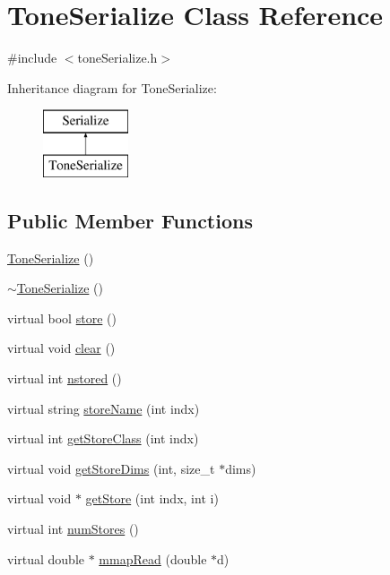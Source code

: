 \hypertarget{classToneSerialize}{\section{Tone\-Serialize Class Reference}
\label{classToneSerialize}
}


{\ttfamily \#include $<$tone\-Serialize.\-h$>$}

Inheritance diagram for Tone\-Serialize\-:\begin{figure}[H]
\begin{center}
\leavevmode
\includegraphics[height=2.000000cm]{classToneSerialize}
\end{center}
\end{figure}
\subsection*{Public Member Functions}
\begin{DoxyCompactItemize}
\item 
\hyperlink{classToneSerialize_aa7a4f5168cfa0f247718c26be93a29b8}{Tone\-Serialize} ()
\item 
\hyperlink{classToneSerialize_a05907704997b3c3456cef49dc5d68ad8}{$\sim$\-Tone\-Serialize} ()
\item 
virtual bool \hyperlink{classToneSerialize_ab67181fa3c51dded04a2d8b4fc55edb4}{store} ()
\item 
virtual void \hyperlink{classToneSerialize_a1670e9459e05b63f1b6fff4d6ff13099}{clear} ()
\item 
virtual int \hyperlink{classToneSerialize_a6a5a872eb9e1a282c0de2221c777c144}{nstored} ()
\item 
virtual string \hyperlink{classToneSerialize_a4ae952e04b0a89ba3d5a8cb82460b064}{store\-Name} (int indx)
\item 
virtual int \hyperlink{classToneSerialize_a651a5292dabf70de6f562695ca034d8d}{get\-Store\-Class} (int indx)
\item 
virtual void \hyperlink{classToneSerialize_a3756f8357f284843aeaa5c56f98ff5db}{get\-Store\-Dims} (int, size\-\_\-t $\ast$dims)
\item 
virtual void $\ast$ \hyperlink{classToneSerialize_a6999157d41af65a3b7e8ea101972fd4e}{get\-Store} (int indx, int i)
\item 
virtual int \hyperlink{classToneSerialize_a85f4bff56b0f43466079c2ff289aa03a}{num\-Stores} ()
\item 
virtual double $\ast$ \hyperlink{classToneSerialize_adaf612569b11204b02fc3393b780f75e}{mmap\-Read} (double $\ast$d)
\end{DoxyCompactItemize}
